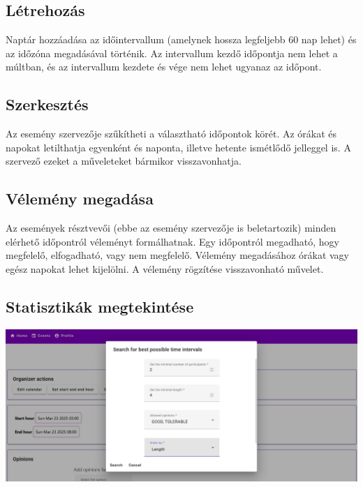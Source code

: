 \documentclass[a4paper,12pt]{report}
\theoremstyle{definition}
\theoremstyle{remark}
\begin{document}
	\subsection{Létrehozás}

Naptár hozzáadása az időintervallum (amelynek hossza legfeljebb 60 nap lehet) és az időzóna megadásával történik. Az intervallum kezdő időpontja nem lehet a múltban, és az intervallum kezdete és vége nem lehet ugyanaz az időpont.

	\subsection{Szerkesztés}

Az esemény szervezője szűkítheti a választható időpontok körét. Az órákat és napokat letilthatja egyenként és naponta, illetve hetente ismétlődő jelleggel is. A szervező ezeket a műveleteket bármikor visszavonhatja.

	\subsection{Vélemény megadása}

Az események résztvevői (ebbe az esemény szervezője is beletartozik) minden elérhető időpontról véleményt formálhatnak. Egy időpontról megadható, hogy megfelelő, elfogadható, vagy nem megfelelő. Vélemény megadásához órákat vagy egész napokat lehet kijelölni. A vélemény rögzítése visszavonható művelet.

	\subsection{Statisztikák megtekintése}

\begin{center}
\includegraphics[width=150mm]{get_best_dialog}
\captionsetup{width=0.8\linewidth}
\label{get_best_dialog}
\end{center}
\end{document}
